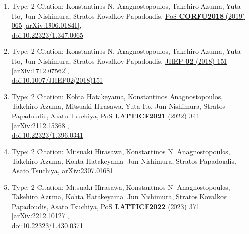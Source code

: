 \documentclass[a4paper,10pt]{article}
\begin{document}
\begin{enumerate}
\begin{enumerate}
  \item Type: 2 Citation: Konstantinos N. Anagnostopoulos, Takehiro Azuma, Yuta Ito, Jun Nishimura, Stratos Kovalkov Papadoudis, \href{https://www.doi.org/10.22323/1.347.0065}{PoS {\bf CORFU2018} (2019) 065}  \href{https://arxiv.org/abs/1906.01841}{[arXiv:1906.01841]},\\\href{https://www.doi.org/10.22323/1.347.0065}{doi:10.22323/1.347.0065}
  \item Type: 2 Citation: Konstantinos N. Anagnostopoulos, Takehiro Azuma, Yuta Ito, Jun Nishimura, Stratos Kovalkov Papadoudis, \href{https://www.doi.org/10.1007/JHEP02(2018)151}{JHEP {\bf 02} (2018) 151}  \href{https://arxiv.org/abs/1712.07562}{[arXiv:1712.07562]},\\\href{https://www.doi.org/10.1007/JHEP02(2018)151}{doi:10.1007/JHEP02(2018)151}
  \item Type: 2 Citation: Kohta Hatakeyama, Konstantinos Anagnostopoulos, Takehiro Azuma, Mitsuaki Hirasawa, Yuta Ito, Jun Nishimura, Stratos Papadoudis, Asato Tsuchiya, \href{https://www.doi.org/10.22323/1.396.0341}{PoS {\bf LATTICE2021} (2022) 341}  \href{https://arxiv.org/abs/2112.15368}{[arXiv:2112.15368]},\\\href{https://www.doi.org/10.22323/1.396.0341}{doi:10.22323/1.396.0341}
  \item Type: 2 Citation: Mitsuaki Hirasawa, Konstantinos N. Anagnostopoulos, Takehiro Azuma, Kohta Hatakeyama, Jun Nishimura, Stratos Papadoudis, Asato Tsuchiya, \href{https://arxiv.org/abs/2307.01681}{arXiv:2307.01681}
  \item Type: 2 Citation: Mitsuaki Hirasawa, Konstantinos N. Anagnostopoulos, Takehiro Azuma, Kohta Hatakeyama, Jun Nishimura, Stratos Kovalkov Papadoudis, Asato Tsuchiya, \href{https://www.doi.org/10.22323/1.430.0371}{PoS {\bf LATTICE2022} (2023) 371}  \href{https://arxiv.org/abs/2212.10127}{[arXiv:2212.10127]},\\\href{https://www.doi.org/10.22323/1.430.0371}{doi:10.22323/1.430.0371}

\end{enumerate}
\end{enumerate}
\end{document}
